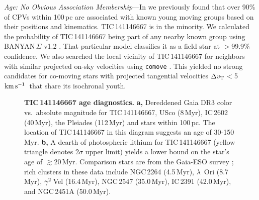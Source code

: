 \documentclass[11pt,twocolumn,tighten]{aastex7}
\newcommand{\kms}{\ensuremath{\rm km\,s^{-1}}}
\begin{document}
{\it Age: No Obvious Association Membership}---In \citet{Bouma2024} we
previously found that over 90\% of CPVs within 100\,pc are associated
with known young moving groups based on their positions and
kinematics.  TIC\,141146667 is in the minority.  We calculated the
probability of TIC\,141146667 being part of any nearby known group
using BANYAN\,$\Sigma$ v1.2 \citep{Gagne2018}.  That particular model
classifies it as a field star at $>$99.9\% confidence.  We also
searched the local vicinity of TIC\,141146667 for neighbors with
similar projected on-sky velocities using \texttt{comove}
\citep{Tofflemire2021}.  This yielded no strong candidates for
co-moving stars with projected tangential velocities $\Delta v_{\rm
T}$$<$5\,\kms\ that share its isochronal youth.

\begin{figure}[!t]
	\begin{center}
	\end{center}
	\vspace{-0.3cm}
  \caption{{\bf TIC\,141146667 age diagnostics.}
  {\bf a,} Dereddened Gaia DR3 color vs.~absolute magnitude for
  TIC\,141146667, USco (8\,Myr), IC\,2602 (40\,Myr), the Pleiades
  (112\,Myr) and stars within 100\,pc. 
  The location of TIC\,141146667 in this diagram suggests an age of
  30-150\,Myr. 
  {\bf b,} A dearth of photospheric lithium for TIC\,141146667 (yellow
  triangle denotes 2$\sigma$ upper limit) yields a lower bound on the
  star's age of $\gtrsim$20\,Myr.  Comparison stars are from the
  Gaia-ESO survey \citep{Jeffries2023}; rich clusters in these data
  include NGC\,2264 (4.5\,Myr), $\lambda$~Ori (8.7\,Myr), ${\rm
  \gamma}^2$\,Vel (16.4\,Myr), NGC\,2547 (35.0\,Myr), IC\,2391
  (42.0\,Myr), and NGC\,2451A (50.0\,Myr).}
  \label{fig:age_diagnostics}
\end{figure}
\end{document}
